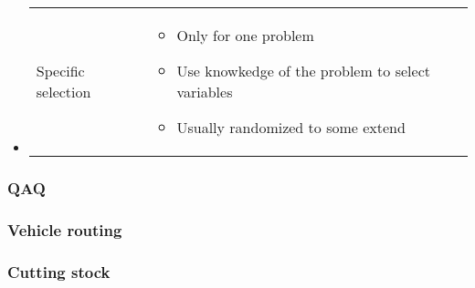 \begin{itemize}
\begin{itemize}
        \item \begin{tabular}{m{3cm}m{10cm}}
                    Specific selection &
                \begin{itemize}
                    \item Only for one problem
                    \item Use knowkedge of the problem to select variables
                    \item Usually randomized to some extend
                \end{itemize}
            \end{tabular}
        \end{itemize}
\end{itemize}

\subsubsection{QAQ}

\subsubsection{Vehicle routing}

\subsubsection{Cutting stock}








